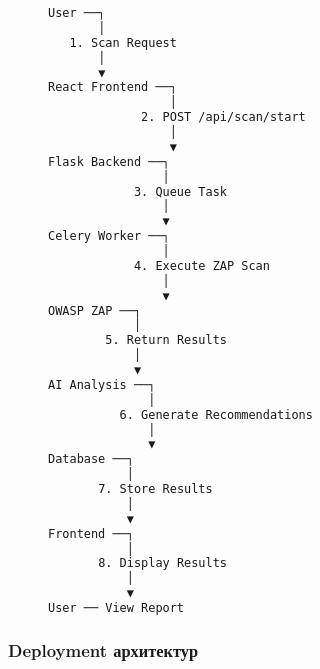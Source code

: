\documentclass[main.tex]{subfiles}
\begin{document}
\begin{figure}[h]
\centering
\begin{lstlisting}[language=bash, caption=Скан процессийн өгөгдлийн урсгал]
User ──┐
       │
   1. Scan Request
       │
       ▼
React Frontend ──┐
                 │
             2. POST /api/scan/start
                 │
                 ▼
Flask Backend ──┐
                │
            3. Queue Task
                │
                ▼
Celery Worker ──┐
                │
            4. Execute ZAP Scan
                │
                ▼
OWASP ZAP ──┐
            │
        5. Return Results
            │
            ▼
AI Analysis ──┐
              │
          6. Generate Recommendations
              │
              ▼
Database ──┐
           │
       7. Store Results
           │
           ▼
Frontend ──┐
           │
       8. Display Results
           │
           ▼
User ── View Report
\end{lstlisting}
\end{figure}

\subsubsection{Deployment архитектур}
\end{document}

